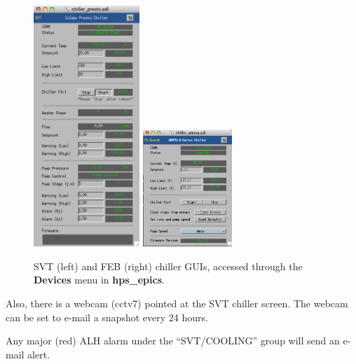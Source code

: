 \begin{figure}[!ht]
    \begin{center}
        \includegraphics[width=4cm]{figures/svt_svtChiller.png}
        \includegraphics[width=0.3\textwidth]{figures/svt_febChiller.png}
        \caption{SVT (left) and FEB (right) chiller GUIs, accessed through the \textbf{Devices} menu in \textbf{hps\_epics}.}
        \label{fig:ctrl_cooling_chillers}
    \end{center}
\end{figure}

Also, there is a webcam (cctv7) pointed at the SVT chiller screen. The webcam can be set to e-mail a snapshot every 24 hours.

Any major (red) ALH alarm under the ``SVT/COOLING'' group will send an e-mail alert.
